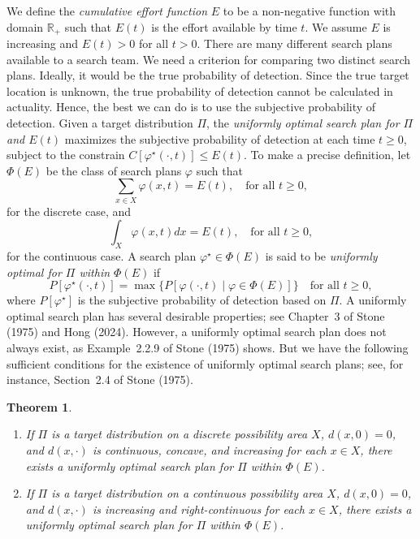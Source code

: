 \documentclass[12pt]{article}
\newtheorem{theorem}{Theorem}[section]
\theoremstyle{plain}
\theoremstyle{definition}
\theoremstyle{remark}
\begin{document}
We define the \emph{cumulative effort function} $E$ to be a non-negative function with domain $\mathbb{R}_+$ such that $E(t)$ is the effort available by time $t$.  We assume $E$ is increasing and $E(t)>0$ for all $t>0$.  There are many different search plans available to a search team.  We need a criterion for comparing two distinct search plans. Ideally,   it would be the true probability of detection.  Since the true target location is unknown, the true probability of detection cannot be calculated in actuality.  Hence,  the best we can do is to use the subjective probability of detection.  Given a target distribution $\Pi$,  the \emph{uniformly optimal search plan for $\Pi$ and $E(t)$}  maximizes the subjective probability of detection at each time $t\geq 0$, subject to the constrain $C[\varphi^\star(\cdot, t)]\leq E(t)$.  To make a precise definition, let $\Phi(E)$ be the class of search plans $\varphi$ such that 
\begin{equation}
\label{eq:uniformdis1}
\sum_{x\in X}\varphi(x, t)=E(t), \quad \text{for all $t\geq0$},
\end{equation}
for the discrete case,  and 
\begin{equation}
\label{eq:uniformcon1}
\int_X\varphi(x, t)dx=E(t), \quad \text{for all $t\geq0$},
\end{equation}
for the continuous case. A search plan $\varphi^\star\in \Phi(E)$ is said to be \emph{uniformly optimal for $\Pi$ within $\Phi(E)$} if 
\begin{equation}
\label{eq:uniform}
P[\varphi^\star(\cdot, t)]=\max\{P[\varphi(\cdot, t)\mid \varphi\in \Phi(E)]\}\quad \text{for all $t\geq 0$},
\end{equation}
where $P[\varphi^\star]$ is the subjective probability of detection based on $\Pi$.   A uniformly optimal search plan has several desirable properties; see Chapter~3 of Stone (1975) and Hong (2024).  However, a uniformly optimal search plan does not always exist, as Example~2.2.9 of Stone (1975) shows.   But we have the following sufficient conditions for the existence of uniformly optimal search plans; see, for instance, Section~2.4 of Stone (1975).  

\begin{theorem}
\label{thm:unifexistence}
\
\begin{enumerate}
\item[(i)]If $\Pi$ is a target distribution on a discrete possibility area $X$, $d(x, 0)=0$,  and $d(x, \cdot)$ is continuous,  concave, and increasing for each $x\in X$,  there exists a uniformly optimal search plan for $\Pi$ within $\Phi(E)$.   
\item[(ii)]If $\Pi$ is a target distribution on a continuous possibility area $X$,  $d(x, 0)=0$, and $d(x, \cdot)$ is increasing and right-continuous for each $x\in X$,  there exists a uniformly optimal search plan for $\Pi$  within $\Phi(E)$.   
\end{enumerate}
\end{theorem}
\end{document}
